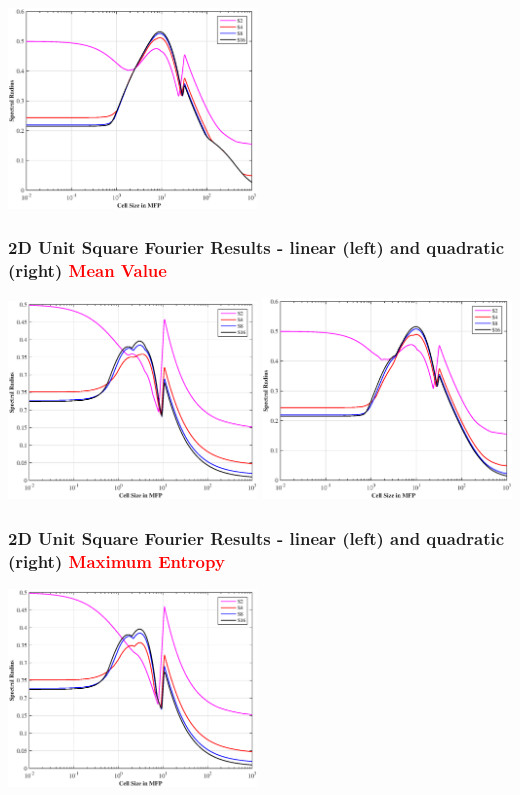 \documentclass[compress,10pt]{beamer}
\newcommand{\tcr}[1]{\textcolor{red}{#1}}
\begin{document}
\begin{frame}[t]
{\includegraphics[width=0.495\textwidth]{images/SI_MIP_quad_C=4_UPWLD2_LS.eps}
}
{
\frametitle{\small 2D Unit Square Fourier Results - linear (left) and quadratic (right) \tcr{Mean Value}}
\vspace{1cm}
\includegraphics[width=0.495\textwidth]{images/SI_MIP_quad_C=4_UMV1_LS.eps}
\includegraphics[width=0.495\textwidth]{images/SI_MIP_quad_C=4_UMV2_LS.eps}
}
{
\frametitle{\small 2D Unit Square Fourier Results - linear (left) and quadratic (right) \tcr{Maximum Entropy}}
\vspace{1cm}
\includegraphics[width=0.495\textwidth]{images/SI_MIP_quad_C=4_MAXENT1_LS.eps}
}
\end{frame}
\end{document}
